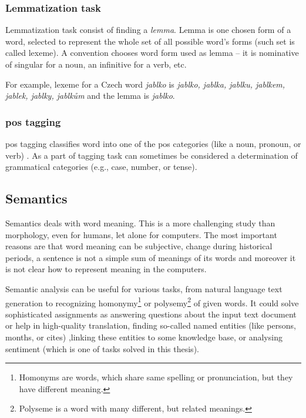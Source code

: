\par
\subsubsection{Lemmatization task}
Lemmatization task consist of finding a \textit{lemma}. Lemma is one chosen form of a word, selected to represent the whole set of all possible word's forms (such set is called lexeme).  A convention chooses word form used as lemma -- it is nominative of singular for a noun, an infinitive for a verb, etc.
\par
For example, lexeme for a Czech word \textit{jablko} is \textit{jablko, jablka, jablku,  jablkem, jablek, jablky, jablkům} and the lemma is \textit{jablko}.

\subsubsection{\acrshort{pos} tagging} 
\acrshort{pos} tagging classifies word into one of the \acrshort{pos} categories (like a noun, pronoun, or verb) \citep{Hladka}. As a part of tagging task can sometimes be considered a determination of grammatical categories (e.g., case, number, or tense). 

\subsection{Semantics}
Semantics deals with word meaning. This is a more challenging study than morphology, even for humans, let alone for computers. The most important reasons are that word meaning can be subjective, change during historical periods, a sentence is not a simple sum of meanings of its words and moreover it is not clear how to represent meaning in the computers.
\par
Semantic analysis can be useful for various tasks, from natural language text generation to recognizing homonymy\footnote{Homonyms are words, which share same spelling or pronunciation, but they have different meaning.} or polysemy\footnote{Polyseme is a word with many different, but related meanings.} of given words. It could solve sophisticated assignments as answering questions about the input text document or help in high-quality translation, finding so-called named entities (like persons, months, or cites) ,linking these entities to some knowledge base, or analysing sentiment (which is one of tasks solved in this thesis).

